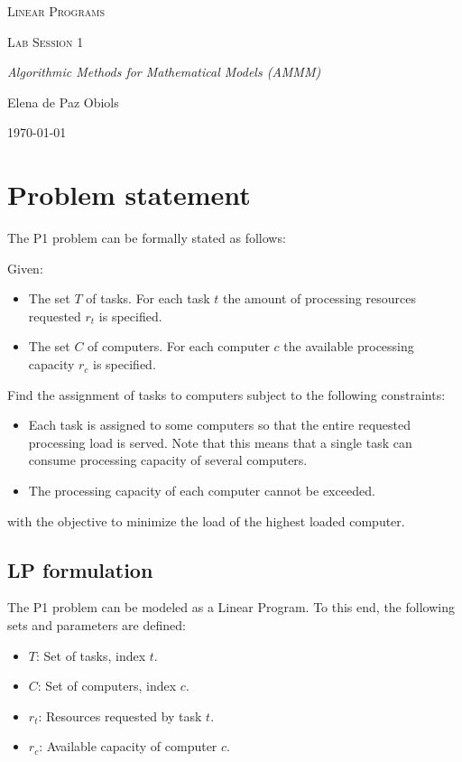 \documentclass{article}
\begin{document}
\begin{titlepage}
\centering
\vspace*{7cm}
{\scshape\Huge Linear Programs \par}
\vspace{1cm}
{\scshape\Large Lab Session 1 \par}
\vspace{1cm}
{\itshape\Large Algorithmic Methods for Mathematical Models (AMMM) \par}
\vspace{8cm}
{\Large Elena de Paz Obiols \par}
{\Large \today \par}
\end{titlepage}
\vspace*{0.5cm}

\tableofcontents
\newpage
\section{Problem statement}

The P1 problem can be formally stated as follows:

Given:
\begin{itemize}
    \item The set $T$ of tasks. For each task $t$ the amount of processing resources requested $r_t$ is specified.
    \item The set $C$ of computers. For each computer $c$ the available processing capacity $r_c$ is specified.
\end{itemize}

Find the assignment of tasks to computers subject to the following constraints:
\begin{itemize}
    \item Each task is assigned to some computers so that the entire requested processing load is served. Note that this means that a single task can consume processing capacity of several computers.
    \item The processing capacity of each computer cannot be exceeded.
\end{itemize}

with the objective to minimize the load of the highest loaded computer.


\subsection*{LP formulation}
The P1 problem can be modeled as a Linear Program. To this end, the following
sets and parameters are defined:
\begin{itemize}
    \item $T$: Set of tasks, index $t$.
    \item $C$: Set of computers, index $c$.
    \item $r_t$: Resources requested by task $t$.
    \item $r_c$: Available capacity of computer $c$.
\end{itemize}
\end{document}
